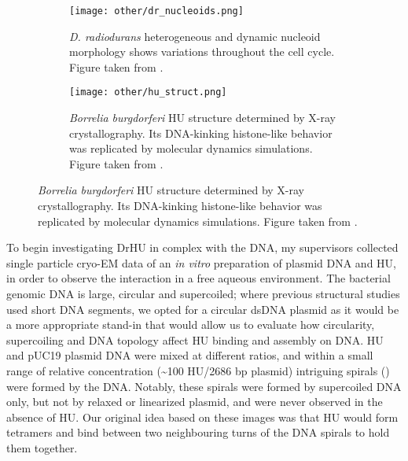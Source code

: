 \begin{figure}
    \centering
    \begin{subfigure}[B]{.48\textwidth}
        \centering
        \texttt{[image: other/dr\_nucleoids.png]}
        \caption{\textit{D. radiodurans} heterogeneous and dynamic nucleoid morphology shows variations throughout the cell cycle. Figure taken from \citet{flochCellMorphologyNucleoid2019}.}
        \label{fig:hu_nucleoids}
    \end{subfigure}%
    \hfill
    \begin{subfigure}[B]{.5\textwidth}
        \centering
        \texttt{[image: other/hu\_struct.png]}
        \caption{\textit{Borrelia burgdorferi} HU structure determined by X-ray crystallography. Its DNA-kinking histone-like behavior was replicated by molecular dynamics simulations. Figure taken from \citet{hognonMolecularBasesDNA2019}.}
        \label{fig:hu_structure}
    \end{subfigure}%
    \label{fig:hu}
\end{figure}

To begin investigating DrHU in complex with the DNA, my supervisors collected single particle cryo-EM data of an \textit{in vitro} preparation of plasmid DNA and HU, in order to observe the interaction in a free aqueous environment.
The bacterial genomic DNA is large, circular and supercoiled; where previous structural studies used short DNA segments, we opted for a circular dsDNA plasmid as it would be a more appropriate stand-in that would allow us to evaluate how circularity, supercoiling and DNA topology affect HU binding and assembly on DNA.
HU and pUC19 plasmid DNA were mixed at different ratios, and within a small range of relative concentration (\sim100 HU/2686 bp plasmid) intriguing spirals () were formed by the DNA.
Notably, these spirals were formed by supercoiled DNA only, but not by relaxed or linearized plasmid, and were never observed in the absence of HU.
Our original idea based on these images was that HU would form tetramers and bind between two neighbouring turns of the DNA spirals to hold them together.

